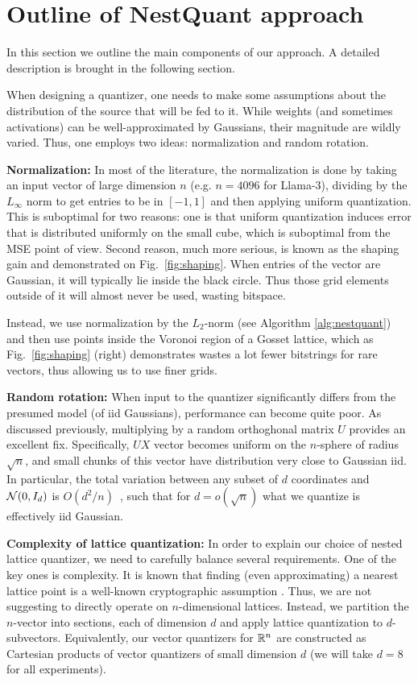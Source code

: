 \section{Outline of NestQuant approach}\label{sec:outline}

In this section we outline the main components of our approach. A detailed description is brought in the following section.

When designing a quantizer, one needs to make some assumptions about the distribution of the source that will be fed to it. While weights (and sometimes activations) can be well-approximated by Gaussians, their magnitude are wildly varied. Thus, one employs two ideas: normalization and random rotation. 


\textbf{Normalization:}
In most of the literature, the normalization is done by taking an input vector of large dimension $n$ (e.g. $n=4096$ for Llama-3), dividing by the $L_\infty$ norm to get entries to be in $[-1,1]$ and then applying uniform quantization. This is suboptimal for two reasons: one is that uniform quantization induces error that is distributed uniformly on the small cube, which is suboptimal from the MSE point of view. Second reason, much more serious, is known as the shaping gain and demonstrated on Fig.~\ref{fig:shaping}. When entries of the vector are Gaussian, it will typically lie inside the black circle. Thus those grid elements outside of it will almost never be used, wasting bitspace. 

Instead, we use normalization by the $L_2$-norm (see Algorithm \ref{alg:nestquant}) and then use points inside the Voronoi region of a Gosset lattice, which as Fig.~\ref{fig:shaping} (right) demonstrates wastes a lot fewer bitstrings for rare vectors, thus allowing us to use finer grids.

\textbf{Random rotation:} 
When input to the quantizer significantly differs from the presumed model (of iid Gaussians), performance can become quite poor. As discussed previously, multiplying by a random orthoghonal matrix $U$ provides an excellent fix. Specifically, $UX$ vector becomes uniform on the $n$-sphere of radius $\sqrt{n}$, and small chunks of this vector have distribution very close to Gaussian iid. In particular, the total variation between any subset of $d$ coordinates and $\mathcal{N}(0, I_d)$ is $O(d^2/n)$~\cite{stam1982limit}, such that for $d=o(\sqrt{n})$ what we quantize is effectively iid Gaussian.


\textbf{Complexity of lattice quantization:} 
In order to explain our choice of nested lattice quantizer, we need to carefully balance several requirements. One of the key ones is complexity. It is known that finding (even approximating) a nearest lattice point is a well-known cryptographic assumption \cite{DBLP:journals/combinatorica/DinurKRS03}.
Thus, we are not suggesting to directly operate on $n$-dimensional lattices. Instead, we partition the $n$-vector into sections, each of dimension $d$ and apply lattice quantization to $d$-subvectors. Equivalently, our vector quantizers for $\mathbb{R}^n$ are constructed as Cartesian products of vector quantizers of small dimension $d$ (we will take $d=8$ for all experiments).

